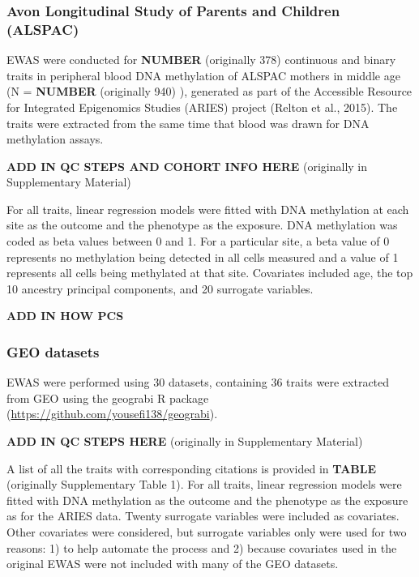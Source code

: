 \documentclass[11pt,twoside]{bristolthesis}
\begin{document}
\hypertarget{avon-longitudinal-study-of-parents-and-children-alspac}{%
\subsubsection{Avon Longitudinal Study of Parents and Children (ALSPAC)}\label{avon-longitudinal-study-of-parents-and-children-alspac}}

EWAS were conducted for \textbf{NUMBER} (originally 378) continuous and binary traits in peripheral blood DNA methylation of ALSPAC mothers in middle age (N = \textbf{NUMBER} (originally 940) ), generated as part of the Accessible Resource for Integrated Epigenomics Studies (ARIES) project (Relton et al., 2015). The traits were extracted from the same time that blood was drawn for DNA methylation assays.

\textbf{ADD IN QC STEPS AND COHORT INFO HERE} (originally in Supplementary Material)

For all traits, linear regression models were fitted with DNA methylation at each site as the outcome and the phenotype as the exposure. DNA methylation was coded as beta values between 0 and 1. For a particular site, a beta value of 0 represents no methylation being detected in all cells measured and a value of 1 represents all cells being methylated at that site. Covariates included age, the top 10 ancestry principal components, and 20 surrogate variables.

\textbf{ADD IN HOW PCS}

\hypertarget{geo-datasets}{%
\subsubsection{GEO datasets}\label{geo-datasets}}

EWAS were performed using 30 datasets, containing 36 traits were extracted from GEO using the geograbi R package (\url{https://github.com/yousefi138/geograbi}).

\textbf{ADD IN QC STEPS HERE} (originally in Supplementary Material)

A list of all the traits with corresponding citations is provided in \textbf{TABLE} (originally Supplementary Table 1).
For all traits, linear regression models were fitted with DNA methylation as the outcome and the phenotype as the exposure as for the ARIES data. Twenty surrogate variables were included as covariates. Other covariates were considered, but surrogate variables only were used for two reasons: 1) to help automate the process and 2) because covariates used in the original EWAS were not included with many of the GEO datasets.
\end{document}
